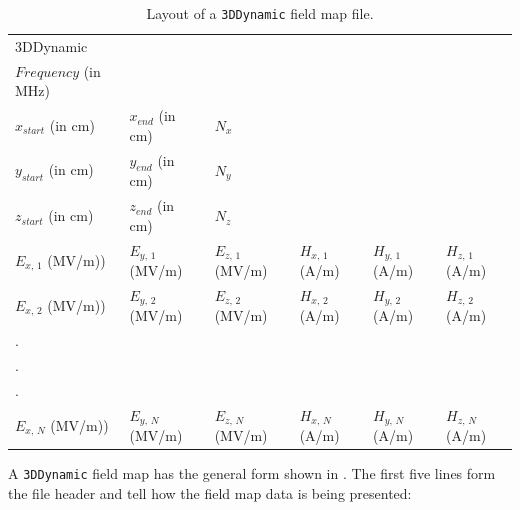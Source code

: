 \begin{table}[ht!]
    \caption{Layout of a \texttt{3DDynamic} field map file.}
    \label{tab:3DDynamic}
    \begin{center}
    \begin{tabular}{llllll}
      \hline
      3DDynamic            &                    &                    &                   &                   &                   \\
      $Frequency$ (in MHz) &                    &                    &                   &                   &                   \\
      $x_{start}$ (in cm)  & $x_{end}$ (in cm)  & $N_{x}$            &                   &                   &                   \\
      $y_{start}$ (in cm)  & $y_{end}$ (in cm)  & $N_{y}$            &                   &                   &                   \\
      $z_{start}$ (in cm)  & $z_{end}$ (in cm)  & $N_{z}$            &                   &                   &                   \\
      $E_{x,\,1}$ (MV/m))  & $E_{y,\,1}$ (MV/m) & $E_{z,\,1}$ (MV/m) & $H_{x,\,1}$ (A/m) & $H_{y,\,1}$ (A/m) & $H_{z,\,1}$ (A/m) \\
      $E_{x,\,2}$ (MV/m))  & $E_{y,\,2}$ (MV/m) & $E_{z,\,2}$ (MV/m) & $H_{x,\,2}$ (A/m) & $H_{y,\,2}$ (A/m) & $H_{z,\,2}$ (A/m) \\
      .                    &                    &                    &                   &                   &                   \\
      .                    &                    &                    &                   &                   &                   \\
      .                    &                    &                    &                   &                   &                   \\
      $E_{x,\,N}$ (MV/m))  & $E_{y,\,N}$ (MV/m) & $E_{z,\,N}$ (MV/m) & $H_{x,\,N}$ (A/m) & $H_{y,\,N}$ (A/m) & $H_{z,\,N}$ (A/m) \\
      \hline
    \end{tabular}
    \end{center}
\end{table}

A \texttt{3DDynamic} field map has the general form shown in . The first five lines form
the file header and tell \opalt how the field map data is being presented:

